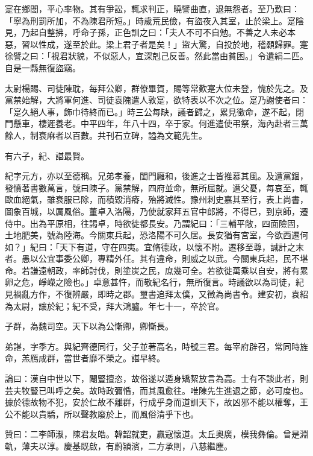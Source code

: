 \begin{pinyinscope}
寔在鄉閭，平心率物。其有爭訟，輒求判正，曉譬曲直，退無怨者。至乃歎曰：「寧為刑罰所加，不為陳君所短。」時歲荒民儉，有盜夜入其室，止於梁上。寔陰見，乃起自整拂，呼命子孫，正色訓之曰：「夫人不可不自勉。不善之人未必本惡，習以性成，遂至於此。梁上君子者是矣！」盜大驚，自投於地，稽顙歸罪。寔徐譬之曰：「視君狀貌，不似惡人，宜深剋己反善。然此當由貧困。」令遺絹二匹。自是一縣無復盜竊。

太尉楊賜、司徒陳耽，每拜公卿，群僚畢賀，賜等常歎寔大位未登，愧於先之。及黨禁始解，大將軍何進、司徒袁隗遣人敦寔，欲特表以不次之位。寔乃謝使者曰：「寔久絕人事，飾巾待終而已。」時三公每缺，議者歸之，累見徵命，遂不起，閉門懸車，棲遲養老。中平四年，年八十四，卒于家。何進遣使弔祭，海內赴者三萬餘人，制衰麻者以百數。共刊石立碑，謚為文範先生。

有六子，紀、諶最賢。

紀字元方，亦以至德稱。兄弟孝養，閨門廱和，後進之士皆推慕其風。及遭黨錮，發憤著書數萬言，號曰陳子。黨禁解，四府並命，無所屈就。遭父憂，每哀至，輒歐血絕氣，雖衰服已除，而積毀消瘠，殆將滅性。豫州刺史嘉其至行，表上尚書，圖象百城，以厲風俗。董卓入洛陽，乃使就家拜五官中郎將，不得已，到京師，遷侍中。出為平原相，往謁卓，時欲徙都長安。乃謂紀曰：「三輔平敞，四面險固，土地肥美，號為陸海。今關東兵起，恐洛陽不可久居。長安猶有宮室，今欲西遷何如？」紀曰：「天下有道，守在四夷。宜脩德政，以懷不附。遷移至尊，誠計之末者。愚以公宜事委公卿，專精外任。其有違命，則威之以武。今關東兵起，民不堪命。若謙遠朝政，率師討伐，則塗炭之民，庶幾可全。若欲徙萬乘以自安，將有累卵之危，崢嶸之險也。」卓意甚忤，而敬紀名行，無所復言。時議欲以為司徒，紀見禍亂方作，不復辨嚴，即時之郡。璽書追拜太僕，又徵為尚書令。建安初，袁紹為太尉，讓於紀；紀不受，拜大鴻臚。年七十一，卒於官。

子群，為魏司空。天下以為公慚卿，卿慚長。

弟諶，字季方。與紀齊德同行，父子並著高名，時號三君。每宰府辟召，常同時旌命，羔鴈成群，當世者靡不榮之。諶早終。

論曰：漢自中世以下，閹豎擅恣，故俗遂以遁身矯絜放言為高。士有不談此者，則芸夫牧豎已叫呼之矣。故時政彌惛，而其風愈往。唯陳先生進退之節，必可度也。據於德故物不犯，安於仁故不離群，行成乎身而道訓天下，故凶邪不能以權奪，王公不能以貴驕，所以聲教廢於上，而風俗清乎下也。

贊曰：二李師淑，陳君友皓。韓韶就吏，贏寇懷道。太丘奧廣，模我彝倫。曾是淵軌，薄夫以淳。慶基既啟，有蔚潁濱，二方承則，八慈繼塵。


\end{pinyinscope}
